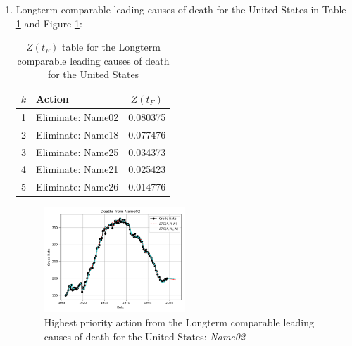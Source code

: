 \documentclass[12pt, a4paper, twocolumn]{article}
\begin{document}
\begin{enumerate}
  \vfill\eject
  \item Longterm comparable leading causes of death for the United States\cite{uslcod19001998,nbermortality,centers2017underlying,uspopulation19002001,censusestimates19001999} in Table \ref{table:ztable4} and Figure \ref{fig:k4}:
    \begin{table}[H]
      \centering
      \begin{tabular}{clc}
        \toprule
          $k$ & Action            & $Z(t_F)$ \\
        \midrule
          1   & Eliminate: Name02 & 0.080375 \\
          2   & Eliminate: Name18 & 0.077476 \\
          3   & Eliminate: Name25 & 0.034373 \\
          4   & Eliminate: Name21 & 0.025423 \\
          5   & Eliminate: Name26 & 0.014776 \\
        \bottomrule
      \end{tabular}
      \caption{$Z(t_F)$ table for the Longterm comparable leading causes of death for the United States}
      \label{table:ztable4}
    \end{table}
    \begin{figure}[H]
      \centering
      \includegraphics[width=0.5\textwidth]{results/US_ICD_LONGTERM_COMPARABLE_LEADING/Name02_ets.png}
      \caption{Highest priority action from the Longterm comparable leading causes of death for the United States: \textit{Name02}}\label{fig:k4}
    \end{figure}
  

\end{enumerate}
\end{document}
